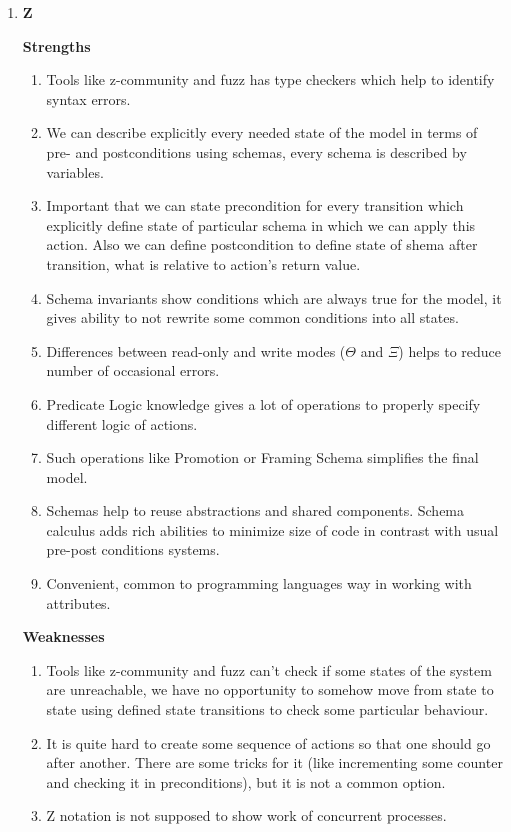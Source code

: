 \documentclass{article}
\begin{document}
\begin{enumerate}
\item \textbf{Z}

\textbf{Strengths}
\begin{enumerate}
\item Tools like z-community and fuzz has type checkers which help to identify syntax errors.
\item We can describe explicitly every needed state of the model in terms of pre- and postconditions using schemas, every schema is described by variables.
\item Important that we can state precondition for every transition which explicitly define state of particular schema in which we can apply this action. Also we can define postcondition to define state of shema after transition, what is relative to action's return value.
\item Schema invariants show conditions which are always true for the model, it gives ability to not rewrite some common conditions into all states.
\item Differences between read-only and write modes ($\Theta$ and $\Xi$) helps to reduce number of occasional errors. 
\item Predicate Logic knowledge gives a lot of operations to properly specify different logic of actions.
\item Such operations like Promotion or Framing Schema simplifies the final model.
\item Schemas help to reuse abstractions and shared components. Schema calculus adds rich abilities to minimize size of code in contrast with usual pre-post conditions systems.
\item Convenient, common to programming languages way in working with attributes.
\end{enumerate}

\textbf{Weaknesses}
\begin{enumerate}
\item Tools like z-community and fuzz can't check if some states of the system are unreachable, we have no opportunity to somehow move from state to state using defined state transitions to check some particular behaviour. 
\item It is quite hard to create some sequence of actions so that one should go after another. There are some tricks for it (like incrementing some counter and checking it in preconditions), but it is not a common option.
\item Z notation is not supposed to show work of concurrent processes.
\end{enumerate}


\end{enumerate}
\end{document}
